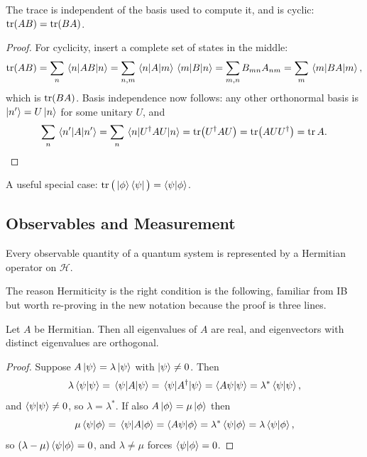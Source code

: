 \documentclass[a4paper]{scrartcl}
\begin{document}
\begin{proposition}
    The trace is independent of the basis used to compute it, and is cyclic: $\tr(AB) = \tr(BA)$.
\end{proposition}
\begin{proof}
    For cyclicity, insert a complete set of states in the middle:
    $$
    \tr(AB) = \sum_n \mel{n}{AB}{n} = \sum_{n,m}\mel{n}{A}{m}\mel{m}{B}{n} = \sum_{m,n} B_{mn}A_{nm} = \sum_m \mel{m}{BA}{m},
    $$
    which is $\tr(BA)$.
    Basis independence now follows: any other orthonormal basis is $\ket{n'} = U\ket{n}$ for some unitary $U$, and
    $$
    \sum_n \mel{n'}{A}{n'} = \sum_n \mel{n}{U^\dagger A U}{n} = \tr(U^\dagger A U) = \tr(A U U^\dagger) = \tr A. \qedhere
    $$
\end{proof}

A useful special case: $\tr\big(\ket{\phi}\bra{\psi}\big) = \braket{\psi}{\phi}$.

\subsection{Observables and Measurement}

\begin{axiom}[Observables]
    Every observable quantity of a quantum system is represented by a Hermitian operator on $\mathcal{H}$.
\end{axiom}

The reason Hermiticity is the right condition is the following, familiar from IB but worth re-proving in the new notation because the proof is three lines.

\begin{proposition}
    Let $A$ be Hermitian. Then all eigenvalues of $A$ are real, and eigenvectors with distinct eigenvalues are orthogonal.
\end{proposition}
\begin{proof}
    Suppose $A\ket{\psi} = \lambda\ket{\psi}$ with $\ket{\psi} \neq 0$. Then
    $$
    \lambda \braket{\psi}{\psi} = \mel{\psi}{A}{\psi} = \mel{\psi}{A^\dagger}{\psi} = \braket{A\psi}{\psi} = \lambda^*\braket{\psi}{\psi},
    $$
    and $\braket{\psi}{\psi} \neq 0$, so $\lambda = \lambda^*$. If also $A\ket{\phi} = \mu\ket{\phi}$ then
    $$
    \mu \braket{\psi}{\phi} = \mel{\psi}{A}{\phi} = \braket{A \psi}{\phi} = \lambda^* \braket{\psi}{\phi} = \lambda \braket{\psi}{\phi},
    $$
    so $(\lambda - \mu)\braket{\psi}{\phi} = 0$, and $\lambda \neq \mu$ forces $\braket{\psi}{\phi} = 0$.
\end{proof}
\end{document}
